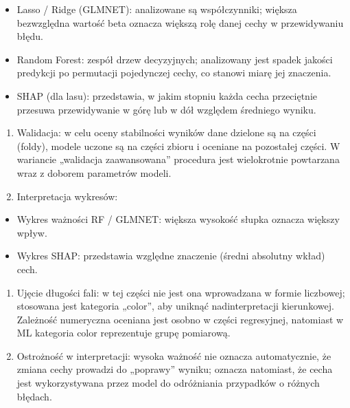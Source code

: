 \documentclass[
  10pt,
]{article}
\providecommand{\tightlist}{%
  \setlength{\itemsep}{0pt}\setlength{\parskip}{0pt}}
\begin{document}
\begin{itemize}
\tightlist
\item
  Lasso / Ridge (GLMNET): analizowane są współczynniki; większa
  bezwzględna wartość \textbar beta\textbar{} oznacza większą rolę
  danej cechy w przewidywaniu błędu.
\item
  Random Forest: zespół drzew decyzyjnych; analizowany jest spadek
  jakości predykcji po permutacji pojedynczej cechy, co stanowi miarę
  jej znaczenia.
\item
  SHAP (dla lasu): przedstawia, w jakim stopniu każda cecha przeciętnie
  przesuwa przewidywanie w górę lub w dół względem średniego wyniku.
\end{itemize}

\begin{enumerate}
\def\labelenumi{\arabic{enumi}.}
\setcounter{enumi}{2}
\tightlist
\item
  Walidacja: w celu oceny stabilności wyników dane dzielone są na
  części (foldy), modele uczone są na części zbioru i oceniane na
  pozostałej części. W wariancie „walidacja zaawansowana'' procedura
  jest wielokrotnie powtarzana wraz z doborem parametrów modeli.
\item
  Interpretacja wykresów:
\end{enumerate}

\begin{itemize}
\tightlist
\item
  Wykres ważności RF / GLMNET: większa wysokość słupka oznacza większy
  wpływ.
\item
  Wykres SHAP: przedstawia względne znaczenie (średni absolutny wkład)
  cech.
\end{itemize}

\begin{enumerate}
\def\labelenumi{\arabic{enumi}.}
\setcounter{enumi}{4}
\tightlist
\item
  Ujęcie długości fali: w tej części nie jest ona wprowadzana w formie
  liczbowej; stosowana jest kategoria „color'', aby uniknąć
  nadinterpretacji kierunkowej. Zależność numeryczna oceniana jest
  osobno w części regresyjnej, natomiast w ML kategoria color
  reprezentuje grupę pomiarową.
\item
  Ostrożność w interpretacji: wysoka ważność nie oznacza automatycznie,
  że zmiana cechy prowadzi do „poprawy'' wyniku; oznacza natomiast, że
  cecha jest wykorzystywana przez model do odróżniania przypadków o
  różnych błędach.
\end{enumerate}
\end{document}
